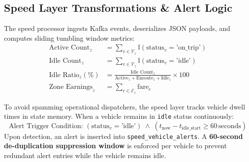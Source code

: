 \documentclass[11pt,a4paper]{article}
\begin{document}
\subsection{Speed Layer Transformations \& Alert Logic}
The speed processor ingests Kafka events, deserializes JSON payloads, and computes sliding tumbling window metrics:
\begin{align}
    \text{Active Count}_z &= \sum_{v \in \mathcal{V}_z} \mathbb{I}(\text{status}_v = \text{'on\_trip'}) \\
    \text{Idle Count}_z &= \sum_{v \in \mathcal{V}_z} \mathbb{I}(\text{status}_v = \text{'idle'}) \\
    \text{Idle Ratio}_z (\%) &= \frac{\text{Idle Count}_z}{\text{Active}_z + \text{Enroute}_z + \text{Idle}_z} \times 100 \\
    \text{Zone Earnings}_z &= \sum_{e \in \mathcal{E}_z} \text{fare}_e
\end{align}

To avoid spamming operational dispatchers, the speed layer tracks vehicle dwell times in state memory. When a vehicle remains in \texttt{idle} status continuously:
\begin{equation}
    \text{Alert Trigger Condition: } \left( \text{status}_v = \text{'idle'} \right) \;\land\; \left( t_{\text{now}} - t_{\text{idle\_start}} \ge 60\,\text{seconds} \right)
\end{equation}
Upon detection, an alert is inserted into \texttt{speed\_vehicle\_alerts}. A \textbf{60-second de-duplication suppression window} is enforced per vehicle to prevent redundant alert entries while the vehicle remains idle.
\end{document}

